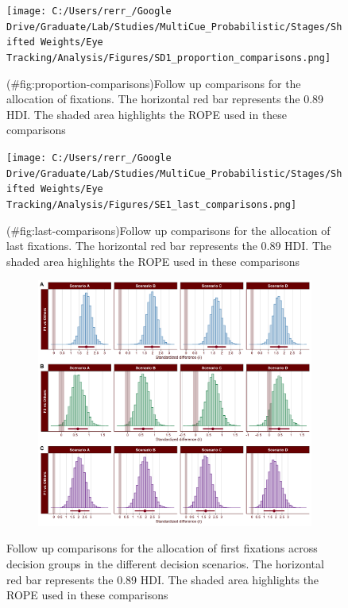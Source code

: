 \begin{appendix}
\begin{figure}
\centering
\texttt{[image: C:/Users/rerr\_/Google Drive/Graduate/Lab/Studies/MultiCue\_Probabilistic/Stages/Shifted Weights/Eye Tracking/Analysis/Figures/SD1\_proportion\_comparisons.png]}
\caption{(\#fig:proportion-comparisons)Follow up comparisons for the
allocation of fixations. The horizontal red bar represents the 0.89 HDI.
The shaded area highlights the ROPE used in these comparisons}
\end{figure}

\begin{figure}
\centering
\texttt{[image: C:/Users/rerr\_/Google Drive/Graduate/Lab/Studies/MultiCue\_Probabilistic/Stages/Shifted Weights/Eye Tracking/Analysis/Figures/SE1\_last\_comparisons.png]}
\caption{(\#fig:last-comparisons)Follow up comparisons for the
allocation of last fixations. The horizontal red bar represents the 0.89
HDI. The shaded area highlights the ROPE used in these comparisons}
\end{figure}

\begin{figure}[!b]
    \centering
    \begin{subfigure}{1\textwidth}
        \includegraphics[width=\linewidth]{Figures/SC2_first_scenario_comparisons_A.png}
        \label{fig:first-scenario-comparisons-A}
    \end{subfigure}
    \caption[]{Follow up comparisons for the allocation of first fixations across decision groups in the different decision scenarios. The horizontal red bar represents the 0.89 HDI. The shaded area highlights the ROPE used in these comparisons}
\end{figure}


\end{appendix}
